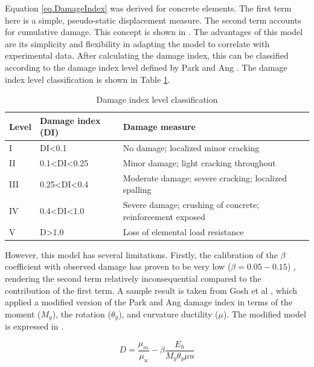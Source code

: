 Equation \ref{eq.DamageIndex} was derived for concrete elements. The first term here is a simple, pseudo-static displacement measure. The second term accounts for cumulative damage. This concept is shown in . The advantages of this model are its simplicity and flexibility in adapting the model to correlate with experimental data. After calculating the damage index, this can be classified according to the damage index level defined by Park and Ang \cite{Young-JiPark1985}. The damage index level classification is shown in Table \ref{tab:DI_Level}.
\begin{table}[htbp]
    \caption{Damage index level classification \cite{Young-JiPark1985}}
	\label{tab:DI_Level}
	\centering	
        \begin{tabular}{lll}
        \hline
        Level & Damage index (DI)               & Damage measure                                             \\ \hline
        I     & DI\textless{}0.1                & No damage; localized minor cracking                        \\
        II    & 0.1\textless{}DI\textless{}0.25 & Minor damage; light cracking throughout                    \\
        III   & 0.25\textless{}DI\textless{}0.4 & Moderate damage; severe cracking; localized spalling       \\
        IV    & 0.4\textless{}DI\textless{}1.0  & Severe damage; crushing of concrete; reinforcement exposed \\
        V     & D\textgreater{}1.0              & Loss of elemental load resistance                          \\ \hline
\end{tabular}
\end{table}

However, this model has several limitations. Firstly, the calibration of the $\beta$ coefficient with observed damage has proven to be very low ($\beta=0.05-0.15$) \cite{Young-JiPark1985} \cite{Ghosh2015}, rendering the second term relatively inconsequential compared to the contribution of the first term. A sample result is taken from Gosh et al \cite{Ghosh2015}, which applied a modified version of the Park and Ang damage index in terms of the moment ($M_{y}$), the rotation ($\theta_y$), and curvature ductility ($\mu$). The modified model is expressed in .

\begin{equation}
	D=\frac{\mu_{m}}{\mu_{u}}-\beta\frac{E_h}{M_{y}\theta_y\mu{u}}
	\label{eq.DamageIndexGhosh}
\end{equation}

